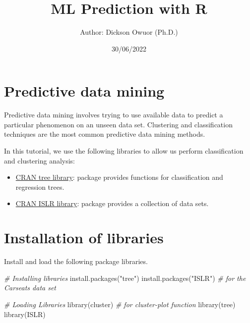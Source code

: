 \documentclass[
]{article}
\title{ML Prediction with R}
\author{Author: Dickson Owuor (Ph.D.)}
\date{30/06/2022}
\newenvironment{Shaded}{\begin{snugshade}}{\end{snugshade}}
\newcommand{\CommentTok}[1]{\textcolor[rgb]{0.56,0.35,0.01}{\textit{#1}}}
\newcommand{\FunctionTok}[1]{\textcolor[rgb]{0.00,0.00,0.00}{#1}}
\newcommand{\NormalTok}[1]{#1}
\newcommand{\StringTok}[1]{\textcolor[rgb]{0.31,0.60,0.02}{#1}}
\providecommand{\tightlist}{%
  \setlength{\itemsep}{0pt}\setlength{\parskip}{0pt}}
\begin{document}
\maketitle

{
\setcounter{tocdepth}{2}
\tableofcontents
}
\hypertarget{predictive-data-mining}{%
\section{Predictive data mining}\label{predictive-data-mining}}

Predictive data mining involves trying to use available data to predict
a particular phenomenon on an unseen data set. Clustering and
classification techniques are the most common predictive data mining
methods.

In this tutorial, we use the following libraries to allow us perform
classification and clustering analysis:

\begin{itemize}
\tightlist
\item
  \href{https://cran.r-project.org/web/packages/tree/index.html}{CRAN
  tree library}: package provides functions for classification and
  regression trees.
\item
  \href{https://cran.r-project.org/web/packages/ISLR/index.html}{CRAN
  ISLR library}: package provides a collection of data sets.
\end{itemize}

\hypertarget{installation-of-libraries}{%
\section{Installation of libraries}\label{installation-of-libraries}}

Install and load the following package libraries.

\begin{Shaded}
\begin{Highlighting}[]
\CommentTok{\# Installing libraries}
\FunctionTok{install.packages}\NormalTok{(}\StringTok{"tree"}\NormalTok{)}
\FunctionTok{install.packages}\NormalTok{(}\StringTok{"ISLR"}\NormalTok{) }\CommentTok{\# for the Carseats data set}

\CommentTok{\# Loading Libraries}
\FunctionTok{library}\NormalTok{(cluster) }\CommentTok{\# for cluster{-}plot function}
\FunctionTok{library}\NormalTok{(tree)}
\FunctionTok{library}\NormalTok{(ISLR)}
\end{Highlighting}
\end{Shaded}
\end{document}

